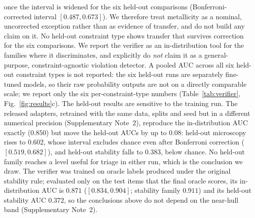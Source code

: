\documentclass[pdflatex,sn-nature]{sn-jnl}
\newcommand{\rev}[1]{#1}
\newcommand{\rev}[1]{{\color{blue}#1}}
\begin{document}
once the interval is widened for the six held-out comparisons (Bonferroni-corrected interval
$[0.487,0.673]$). We therefore treat metallicity as a nominal, uncorrected exception rather
than as evidence of transfer, and do not build any claim on it. \rev{No held-out constraint type shows transfer that survives correction for the six comparisons.} We report the verifier as an
in-distribution tool \rev{for the families where it discriminates}, and explicitly do \emph{not} claim it as a general-purpose,
constraint-agnostic violation detector. A pooled AUC across all six held-out constraint
types is not reported: the six held-out runs are separately fine-tuned models, so their raw
probability outputs are not on a directly comparable scale; we report only the six
per-constraint-type numbers (Table~\ref{tab:verifier}, Fig.~\ref{fig:results}c). \rev{The held-out results are sensitive to the training run. The released adapters, retrained
with the same data, splits and seed but in a different numerical precision (Supplementary Note~2),
reproduce the in-distribution AUC exactly ($0.850$) but move the held-out AUCs by up to $0.08$: held-out
microscopy rises to $0.602$, whose interval excludes chance even after Bonferroni correction
($[0.519,0.682]$), and held-out stability falls to $0.383$, below chance. No held-out family reaches a
level useful for triage in either run, which is the conclusion we draw. The verifier was trained on
oracle labels produced under the original stability rule; evaluated only on the test items that the final
oracle scores, its in-distribution AUC is $0.871$ ($[0.834,0.904]$; stability family $0.911$) and its
held-out stability AUC $0.372$, so the conclusions above do not depend on the near-hull band
(Supplementary Note~2).}
\end{document}
